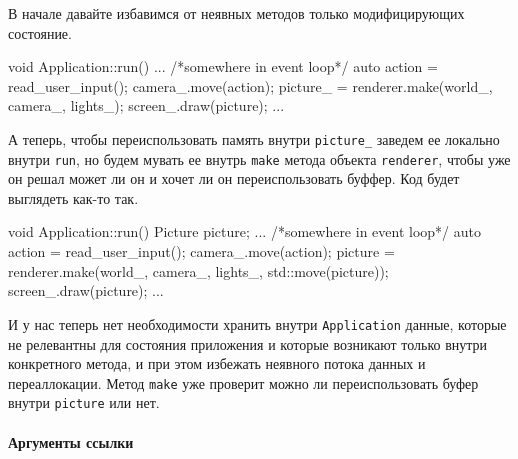 В начале давайте избавимся от неявных методов только модифицирующих состояние.
\begin{cppcode}
void Application::run() {
  ...
  /*somewhere in event loop*/
  auto action = read_user_input();
  camera_.move(action);
  picture_ = renderer.make(world_, camera_, lights_);
  screen_.draw(picture);
  ...
}
\end{cppcode}
А теперь, чтобы переиспользовать память внутри \verb"picture_" заведем ее локально внутри \verb"run", но будем мувать ее внутрь \verb"make" метода объекта \verb"renderer", чтобы уже он решал может ли он и хочет ли он переиспользовать буффер.
Код будет выглядеть как-то так.
\begin{cppcode}
void Application::run() {
  Picture picture;
  ...
  /*somewhere in event loop*/
  auto action = read_user_input();
  camera_.move(action);
  picture = renderer.make(world_, camera_, lights_, std::move(picture));
  screen_.draw(picture);
  ...
}
\end{cppcode}
И у нас теперь нет необходимости хранить внутри \verb"Application" данные, которые не релевантны для состояния приложения и которые возникают только внутри конкретного метода, и при этом избежать неявного потока данных и переаллокации.
Метод \verb"make" уже проверит можно ли переиспользовать буфер внутри \verb"picture" или нет.

\paragraph{Аргументы ссылки}

